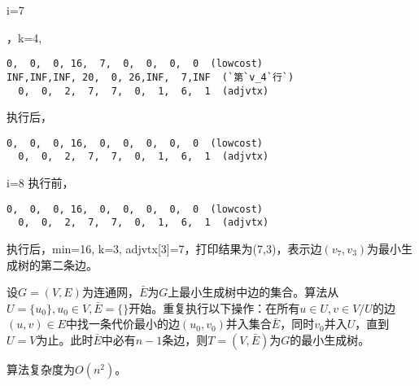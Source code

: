 \begin{frame}\ft{\subsubsecname}
\begin{figure}

\end{figure}
\end{frame}


\begin{frame}[fragile]\ft{\subsubsecname}
\tf i=7 

，k=4,  
\begin{lstlisting}[xleftmargin=2em]
  0,  0,  0, 16,  7,  0,  0,  0,  0  (lowcost)
INF,INF,INF, 20,  0, 26,INF,  7,INF  (`第`v_4`行`)
  0,  0,  2,  7,  7,  0,  1,  6,  1  (adjvtx)
\end{lstlisting}  
执行后，
\begin{lstlisting}[xleftmargin=2em]
  0,  0,  0, 16,  0,  0,  0,  0,  0  (lowcost)
  0,  0,  2,  7,  7,  0,  1,  6,  1  (adjvtx)
\end{lstlisting}
\end{frame}


\begin{frame}[fragile]\ft{\subsubsecname}
\tf i=8 
执行前，
\begin{lstlisting}[xleftmargin=2em]
  0,  0,  0, 16,  0,  0,  0,  0,  0  (lowcost)
  0,  0,  2,  7,  7,  0,  1,  6,  1  (adjvtx)
\end{lstlisting} %
执行后，min=16, k=3, adjvtx[3]=7，打印结果为(7,3)，表示边$(v_7,v_3)$为最小生成树的第二条边。
\end{frame}


\begin{frame}\ft{\subsubsecname}
\begin{figure}

\end{figure}
\end{frame}


\begin{frame}\ft{\subsubsecname}
\tf 设$G=(V,E)$为连通网，$\bar E$为$G$上最小生成树中边的集合。算法从$U=\{u_0\}, u_0\in V, \bar E=\{\}$开始。重复执行以下操作：在所有$u\in U, v\in V/U$的边$(u,v)\in E$中找一条代价最小的边$(u_0,v_0)$并入集合$\bar E$，同时$v_0$并入$U$，直到$U=V$为止。此时$\bar E$中必有$n-1$条边，则$T=(V,\bar E)$为$G$的最小生成树。 \vspace{0.1in}

算法复杂度为$O(n^2)$。
\end{frame}


